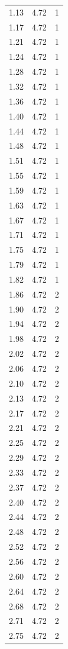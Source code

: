 \begin{longtable}{lrr}
  1.13 & 4.72 & 1 \\
  1.17 & 4.72 & 1 \\
  1.21 & 4.72 & 1 \\
  1.24 & 4.72 & 1 \\
  1.28 & 4.72 & 1 \\
  1.32 & 4.72 & 1 \\
  1.36 & 4.72 & 1 \\
  1.40 & 4.72 & 1 \\
  1.44 & 4.72 & 1 \\
  1.48 & 4.72 & 1 \\
  1.51 & 4.72 & 1 \\
  1.55 & 4.72 & 1 \\
  1.59 & 4.72 & 1 \\
  1.63 & 4.72 & 1 \\
  1.67 & 4.72 & 1 \\
  1.71 & 4.72 & 1 \\
  1.75 & 4.72 & 1 \\
  1.79 & 4.72 & 1 \\
  1.82 & 4.72 & 1 \\
  1.86 & 4.72 & 2 \\
  1.90 & 4.72 & 2 \\
  1.94 & 4.72 & 2 \\
  1.98 & 4.72 & 2 \\
  2.02 & 4.72 & 2 \\
  2.06 & 4.72 & 2 \\
  2.10 & 4.72 & 2 \\
  2.13 & 4.72 & 2 \\
  2.17 & 4.72 & 2 \\
  2.21 & 4.72 & 2 \\
  2.25 & 4.72 & 2 \\
  2.29 & 4.72 & 2 \\
  2.33 & 4.72 & 2 \\
  2.37 & 4.72 & 2 \\
  2.40 & 4.72 & 2 \\
  2.44 & 4.72 & 2 \\
  2.48 & 4.72 & 2 \\
  2.52 & 4.72 & 2 \\
  2.56 & 4.72 & 2 \\
  2.60 & 4.72 & 2 \\
  2.64 & 4.72 & 2 \\
  2.68 & 4.72 & 2 \\
  2.71 & 4.72 & 2 \\
  2.75 & 4.72 & 2 \\

\end{longtable}

